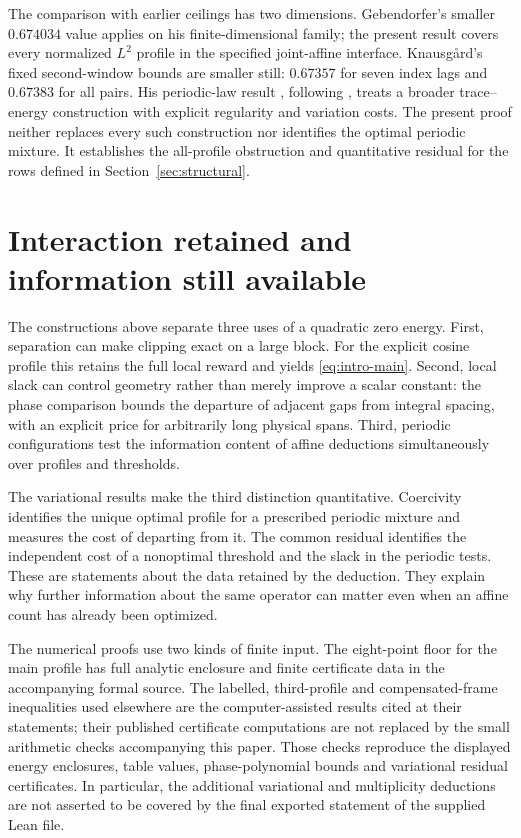 \documentclass[11pt,reqno]{amsart}
\numberwithin{equation}{section}
\begin{document}
The comparison with earlier ceilings has two dimensions.
Gebendorfer's smaller $0.674034$ value applies on his
finite-dimensional family; the present result covers every
normalized $L^2$ profile in the specified joint-affine interface.
Knausg{\aa}rd's fixed second-window bounds
\cite[Proposition 7.3]{Knausgard2026} are smaller still:
$0.67357$ for seven index lags and $0.67383$ for all pairs.
His periodic-law result
\cite[Theorem 7.7 and Corollary 7.9]{Knausgard2026}, following
\cite[Section 7.2]{AF}, treats a broader trace--energy construction
with explicit regularity and variation costs.
The present proof neither replaces every such construction nor
identifies the optimal periodic mixture. It establishes the
all-profile obstruction and quantitative residual for the rows
defined in Section~\ref{sec:structural}.


\section{Interaction retained and information still available}

The constructions above separate three uses of a quadratic zero energy.
First, separation can make clipping exact on a large block. For the
explicit cosine profile this retains the full local reward and yields
\eqref{eq:intro-main}. Second, local slack can control geometry rather
than merely improve a scalar constant: the phase comparison bounds
the departure of adjacent gaps from integral spacing, with an explicit
price for arbitrarily long physical spans. Third, periodic configurations
test the information content of affine deductions simultaneously over
profiles and thresholds.

The variational results make the third distinction quantitative.
Coercivity identifies the unique optimal profile for a prescribed
periodic mixture and measures the cost of departing from it. The
common residual identifies the independent cost of a nonoptimal
threshold and the slack in the periodic tests. These are statements
about the data retained by the deduction. They explain why further
information about the same operator can matter even when an affine
count has already been optimized.

The numerical proofs use two kinds of finite input. The eight-point
floor for the main profile has full analytic enclosure and finite
certificate data in the accompanying formal source. The labelled,
third-profile and compensated-frame inequalities used elsewhere are
the computer-assisted results cited at their statements; their
published certificate computations are not replaced by the small
arithmetic checks accompanying this paper. Those checks reproduce
the displayed energy enclosures, table values, phase-polynomial
bounds and variational residual certificates. In particular, the
additional variational and multiplicity deductions are not asserted
to be covered by the final exported statement of the supplied Lean
file.
\end{document}
